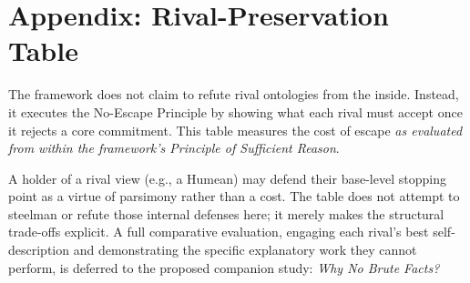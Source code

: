 \documentclass[11pt]{article}
\theoremstyle{canonstyle}
\begin{document}
\newpage
\section*{Appendix: Rival-Preservation Table}
{}

The framework does not claim to refute rival ontologies from the inside. Instead, it executes the No-Escape Principle by showing what each rival must accept once it rejects a core commitment. This table measures the cost of escape \emph{as evaluated from within the framework's Principle of Sufficient Reason}. 

A holder of a rival view (e.g., a Humean) may defend their base-level stopping point as a virtue of parsimony rather than a cost. The table does not attempt to steelman or refute those internal defenses here; it merely makes the structural trade-offs explicit. A full comparative evaluation, engaging each rival's best self-description and demonstrating the specific explanatory work they cannot perform, is deferred to the proposed companion study: \textit{Why No Brute Facts?}
\end{document}
